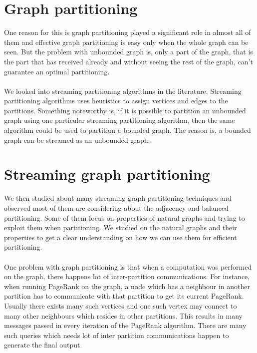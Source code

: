 \documentclass[12pt]{report}
\numberwithin{figure}{section}
\numberwithin{table}{section}
\begin{document}
\section{Graph partitioning}
One reason for this is graph partitioning played a significant role in almost all of them and effective graph partitioning is easy only when the whole graph can be seen. But the problem with unbounded graph is, only a part of the graph, that is the part that has received already and without seeing the rest of the graph, can’t guarantee an optimal partitioning.
 
\paragraph{}

We looked into streaming partitioning algorithms in the literature. Streaming partitioning algorithms uses heuristics\cite{Streaming Balanced Graph Partitioning Algorithms1} \cite{Streaming Balanced Graph Partitioning Algorithms2} to assign vertices and edges to the partitions. Something noteworthy is, if it is possible to partition an unbounded graph using one particular streaming partitioning algorithm, then the same algorithm could be used to partition a bounded graph. The reason is, a bounded graph can be streamed as an unbounded graph.
 
\section{Streaming graph partitioning}
We then studied about many streaming graph partitioning techniques and observed most of them are considering about the adjacency and balanced partitioning. Some of them focus on properties of natural graphs and trying to exploit them when partitioning. We studied on the natural graphs and their properties to get a clear understanding on how we can use them for efficient partitioning. 

\paragraph{}

One problem with graph partitioning  is that when a computation was performed on the graph, there happens lot of inter-partition communications. For instance, when running PageRank on the graph, a node which has a neighbour in another partition has to communicate with that partition to get its current PageRank. Usually there exists many such vertices and one such vertex may connect to many other neighbours which resides in other partitions. This results in many messages passed in every iteration of the PageRank algorithm. There are many such queries which needs lot of inter partition communications happen to generate the final output.
\end{document}

